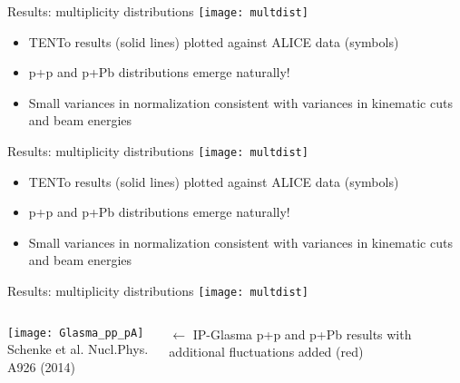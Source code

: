 \documentclass[svgnames]{beamer}
\newcommand{\trento}{T\raisebox{-.5ex}{R}ENTo}
\begin{document}
\begin{frame}[t,noframenumbering]{Results: multiplicity distributions}
 \vspace{0.2 in}
 \texttt{[image: multdist]}
  \begin{itemize}
  \item {\trento} results (solid lines) plotted against ALICE data (symbols)
  \vspace{0.05 in}
  \item p+p and p+Pb distributions emerge naturally!
  \vspace{0.05 in}
  \item Small variances in normalization consistent with variances in kinematic cuts and beam energies 
 \end{itemize}
\end{frame}

\begin{frame}[t,noframenumbering]{Results: multiplicity distributions}
 \vspace{0.2 in}
 \texttt{[image: multdist]}
  \begin{itemize}
  \item {\trento} results (solid lines) plotted against ALICE data (symbols)
  \vspace{0.05 in}
  \item p+p and p+Pb distributions emerge naturally!
  \vspace{0.05 in}
  \item Small variances in normalization consistent with variances in kinematic cuts and beam energies 
 \end{itemize}
\end{frame}

\begin{frame}[t,noframenumbering]{Results: multiplicity distributions}
 \vspace{0.2 in}
 \texttt{[image: multdist]}
 \begin{columns}[T]
  \begin{column}{0.7\textwidth}
   \centering
   \texttt{[image: Glasma\_pp\_pA]} \\
   \vspace{0.1 in}
   \scriptsize Schenke et al. Nucl.Phys. A926 (2014) 
  \end{column}
   \begin{column}{0.3\textwidth}
   \vspace{0.1 in}
   $\leftarrow$ IP-Glasma p+p and p+Pb results with additional fluctuations added (red)
  \end{column}
 \end{columns}
 

\end{frame}
\end{document}
